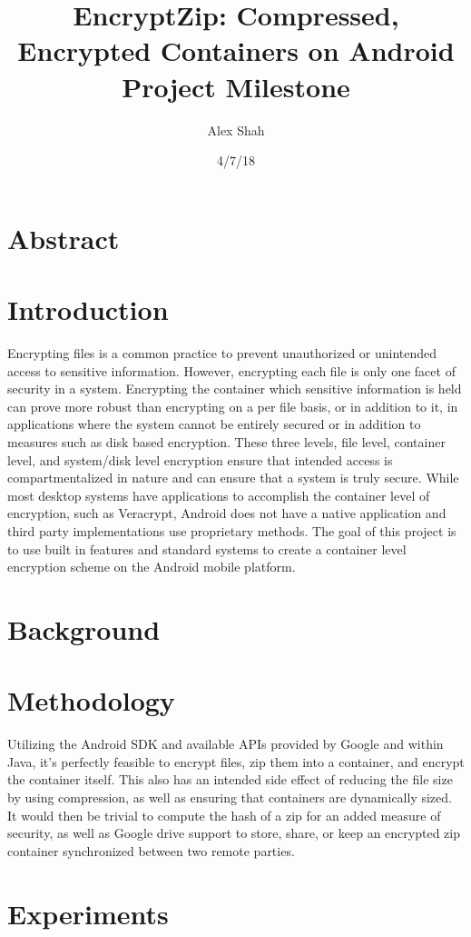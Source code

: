 \documentclass[10pt,a4paper]{article}
\begin{document}
\title{EncryptZip: Compressed, Encrypted Containers on Android \\ Project Milestone}
\author{Alex Shah}
\date{4/7/18}

\maketitle

\section{Abstract}

\section{Introduction}
Encrypting files is a common practice to prevent unauthorized or unintended access to sensitive information. However, encrypting each file is only one facet of security in a system. Encrypting the container which sensitive information is held can prove more robust than encrypting on a per file basis, or in addition to it, in applications where the system cannot be entirely secured or in addition to measures such as disk based encryption. These three levels, file level, container level, and system/disk level encryption ensure that intended access is compartmentalized in nature and can ensure that a system is truly secure. While most desktop systems have applications to accomplish the container level of encryption, such as Veracrypt, Android does not have a native application and third party implementations use proprietary methods. The goal of this project is to use built in features and standard systems to create a container level encryption scheme on the Android mobile platform.

\section{Background}

\section{Methodology}
Utilizing the Android SDK and available APIs provided by Google and within Java, it’s perfectly feasible to encrypt files, zip them into a container, and encrypt the container itself. This also has an intended side effect of reducing the file size by using compression, as well as ensuring that containers are dynamically sized. It would then be trivial to compute the hash of a zip for an added measure of security, as well as Google drive support to store, share, or keep an encrypted zip container synchronized between two remote parties.

\section{Experiments}
\end{document}
